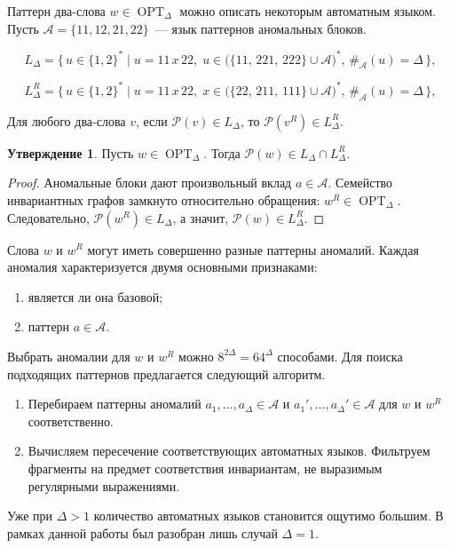 \documentclass{article}
\theoremstyle{definition}
\newtheorem{conjecture}[theorem]{Утверждение}
\newcommand{\pattern}{\mathcal{P}}
\newcommand{\OPT}{\operatorname{OPT}}
\newcommand{\D}{\Delta}
\begin{document}
Паттерн два-слова $w \in \OPT_\D$ можно описать некоторым автоматным языком. Пусть $\mathcal{A} = \{11, 12, 21, 22\}$~--- язык паттернов аномальных блоков.

\[
L_\D = \{\, u \in \{1,2\}^* \mid u = 11\,x\,22,\;
u \in \bigl( \{11,\, 221,\, 222\} \cup \mathcal{A} \bigr)^*,\,
\#_\mathcal{A}(u) = \D \,\},
\]

\[
L_\D^R = \{\, u \in \{1,2\}^* \mid u = 11\,x\,22,\;
x \in \bigl( \{22,\, 211,\, 111\} \cup \mathcal{A} \bigr)^*,\,
\#_\mathcal{A}(u) = \D \,\},
\]

Для любого два-слова $v$, если $\pattern(v) \in L_\D$, 
то $\pattern(v^R) \in L_\D^R$.

\begin{conjecture}
    Пусть $w \in \OPT_\D$. Тогда 
    $\pattern(w) \in L_\D \cap L_\D^R$.
\end{conjecture}

\begin{proof}
    Аномальные блоки дают произвольный вклад 
    $a \in \mathcal{A}$. 
    Семейство инвариантных графов замкнуто 
    относительно обращения: $w^R \in \OPT_\D$. 
    Следовательно, $\pattern(w^R) \in L_\D$, 
    а значит, $\pattern(w) \in L_\D^R$.
\end{proof}

Слова $w$ и $w^R$ могут иметь совершенно разные 
паттерны аномалий. Каждая аномалия характеризуется 
двумя основными признаками:
\begin{enumerate}
    \item является ли она базовой;
    \item паттерн $a \in \mathcal{A}$.
\end{enumerate}

Выбрать аномалии для $w$ и $w^R$ можно 
$8^{2\D} = 64^{\D}$ способами. 
Для поиска подходящих паттернов предлагается 
следующий алгоритм.
\begin{enumerate}
    \item Перебираем паттерны аномалий 
    $a_1,\dots,a_\D \in \mathcal{A}$ и 
    $a_1',\dots,a_\D' \in \mathcal{A}$ 
    для $w$ и $w^R$ соответственно.
    \item Вычисляем пересечение соответствующих 
    автоматных языков. Фильтруем фрагменты 
    на предмет соответствия инвариантам, 
    не выразимым регулярными выражениями.
\end{enumerate}

Уже при $\D > 1$ количество автоматных языков 
становится ощутимо большим. В рамках данной 
работы был разобран лишь случай $\D = 1$.
\end{document}
